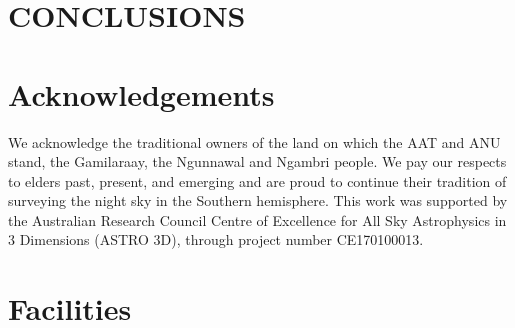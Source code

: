 \documentclass[
  journal=pasa,
  manuscript=research-paper, %
  year=2023,
  volume=37
]{cup-journal}
\newcommand{\SB}[1]{{\textcolor{purple}{#1}}}
\newcommand{\vrad}{$v_\mathrm{rad}$\xspace}
\begin{document}



\newpage
\section{CONCLUSIONS}
\label{sec:conclusion}

\section*{Acknowledgements}

We acknowledge the traditional owners of the land on which the AAT and ANU stand, the Gamilaraay, the Ngunnawal and Ngambri people. We pay our respects to elders past, present, and emerging and are proud to continue their tradition of surveying the night sky in the Southern hemisphere.
This work was supported by the Australian Research Council Centre of Excellence for All Sky Astrophysics in 3 Dimensions (ASTRO 3D), through project number CE170100013.

\section*{Facilities}
\end{document}
